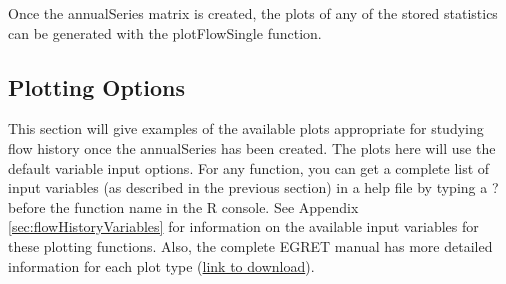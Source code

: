 \documentclass[a4paper,11pt]{article}
\begin{document}
Once the annualSeries matrix is created, the plots of any of the stored statistics can be generated with the plotFlowSingle function.

\subsection{Plotting Options}
\label{sec:plotOptions}
This section will give examples of the available plots appropriate for studying flow history once the annualSeries has been created. The plots here will use the default variable input options.  For any function, you can get a complete list of input variables (as described in the previous section) in a help file by typing a ? before the function name in the R console. See Appendix \ref{sec:flowHistoryVariables} for information on the available input variables for these plotting functions. Also, the complete EGRET manual has more detailed information for each plot type (\href{https://github.com/USGS-R/EGRET/raw/Documentation/EGRET%2Bmanual_4.doc}{link to download}).

\begin{Schunk}
\end{Schunk}
\end{document}
